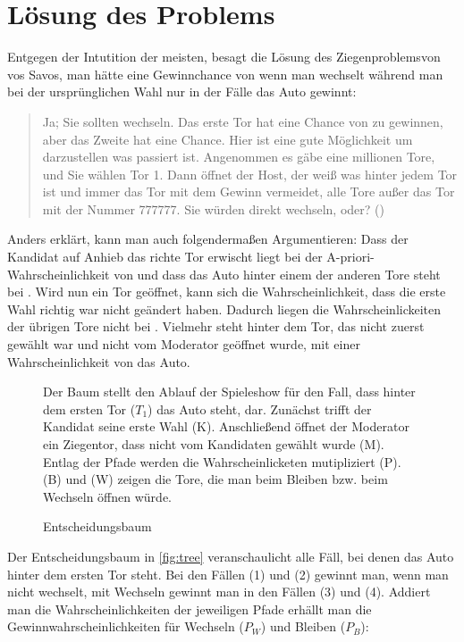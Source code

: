 \chapter{Lösung des Problems}

Entgegen der Intutition der meisten, besagt die Lösung des Ziegenproblemsvon vos Savos, man hätte eine Gewinnchance von  wenn man wechselt während man bei der ursprünglichen Wahl nur in  der Fälle das Auto gewinnt:

\begin{quote}
    Ja; Sie sollten wechseln. Das erste Tor hat eine Chance von  zu gewinnen, aber das Zweite hat eine  Chance. Hier ist eine gute Möglichkeit um darzustellen was passiert ist. Angenommen es gäbe eine millionen Tore, und Sie wählen Tor 1. Dann öffnet der Host, der weiß was hinter jedem Tor ist und immer das Tor mit dem Gewinn vermeidet, alle Tore außer das Tor mit der Nummer 777777. Sie würden direkt wechseln, oder? (\cite{Savant:1990})
\end{quote}

Anders erklärt, kann man auch folgendermaßen Argumentieren: Dass der Kandidat auf Anhieb das richte Tor erwischt liegt bei der A-priori-Wahrscheinlichkeit von  und dass das Auto hinter einem der anderen Tore steht bei . Wird nun ein Tor geöffnet, kann sich die Wahrscheinlichkeit, dass die erste Wahl richtig war nicht geändert haben. Dadurch liegen die Wahrscheinlickeiten der übrigen Tore nicht bei . Vielmehr steht hinter dem Tor, das nicht zuerst gewählt war und nicht vom Moderator geöffnet wurde, mit einer Wahrscheinlichkeit von  das Auto.

\begin{figure}[htbp]
    \centering
    \caption{Entscheidungsbaum}\label{fig:tree}
    \small {Der Baum stellt den Ablauf der Spieleshow für den Fall, dass hinter dem ersten Tor ($T_1$) das Auto steht, dar. Zunächst trifft der Kandidat seine erste Wahl (K). Anschließend öffnet der Moderator ein Ziegentor, dass nicht vom Kandidaten gewählt wurde (M). Entlag der Pfade werden die Wahrscheinlicketen mutipliziert (P). (B) und (W) zeigen die Tore, die man beim Bleiben bzw. beim Wechseln öffnen würde.}
\end{figure}

Der Entscheidungsbaum in \autoref{fig:tree} veranschaulicht alle Fäll, bei denen das Auto hinter dem ersten Tor steht. Bei den Fällen (1) und (2) gewinnt man, wenn man nicht wechselt, mit Wechseln gewinnt man in den Fällen (3) und (4). Addiert man die Wahrscheinlichkeiten der jeweiligen Pfade erhällt man die Gewinnwahrscheinlichkeiten für Wechseln ($P_W$) und Bleiben ($P_B$):

